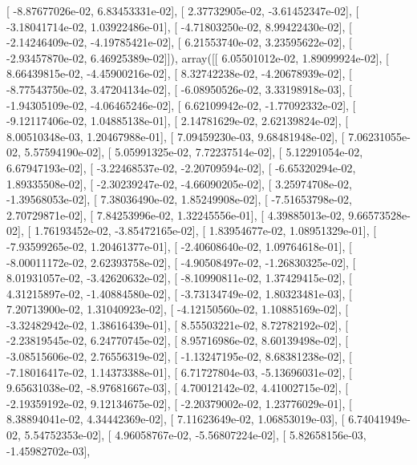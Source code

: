 \documentclass{article}
\begin{document}
       [ -8.87677026e-02,   6.83453331e-02],
       [  2.37732905e-02,  -3.61452347e-02],
       [ -3.18041714e-02,   1.03922486e-01],
       [ -4.71803250e-02,   8.99422430e-02],
       [ -2.14246409e-02,  -4.19785421e-02],
       [  6.21553740e-02,   3.23595622e-02],
       [ -2.93457870e-02,   6.46925389e-02]]), array([[  6.05501012e-02,   1.89099924e-02],
       [  8.66439815e-02,  -4.45900216e-02],
       [  8.32742238e-02,  -4.20678939e-02],
       [ -8.77543750e-02,   3.47204134e-02],
       [ -6.08950526e-02,   3.33198918e-03],
       [ -1.94305109e-02,  -4.06465246e-02],
       [  6.62109942e-02,  -1.77092332e-02],
       [ -9.12117406e-02,   1.04885138e-01],
       [  2.14781629e-02,   2.62139824e-02],
       [  8.00510348e-03,   1.20467988e-01],
       [  7.09459230e-03,   9.68481948e-02],
       [  7.06231055e-02,   5.57594190e-02],
       [  5.05991325e-02,   7.72237514e-02],
       [  5.12291054e-02,   6.67947193e-02],
       [ -3.22468537e-02,  -2.20709594e-02],
       [ -6.65320294e-02,   1.89335508e-02],
       [ -2.30239247e-02,  -4.66090205e-02],
       [  3.25974708e-02,  -1.39568053e-02],
       [  7.38036490e-02,   1.85249908e-02],
       [ -7.51653798e-02,   2.70729871e-02],
       [  7.84253996e-02,   1.32245556e-01],
       [  4.39885013e-02,   9.66573528e-02],
       [  1.76193452e-02,  -3.85472165e-02],
       [  1.83954677e-02,   1.08951329e-01],
       [ -7.93599265e-02,   1.20461377e-01],
       [ -2.40608640e-02,   1.09764618e-01],
       [ -8.00011172e-02,   2.62393758e-02],
       [ -4.90508497e-02,  -1.26830325e-02],
       [  8.01931057e-02,  -3.42620632e-02],
       [ -8.10990811e-02,   1.37429415e-02],
       [  4.31215897e-02,  -1.40884580e-02],
       [ -3.73134749e-02,   1.80323481e-03],
       [  7.20713900e-02,   1.31040923e-02],
       [ -4.12150560e-02,   1.10885169e-02],
       [ -3.32482942e-02,   1.38616439e-01],
       [  8.55503221e-02,   8.72782192e-02],
       [ -2.23819545e-02,   6.24770745e-02],
       [  8.95716986e-02,   8.60139498e-02],
       [ -3.08515606e-02,   2.76556319e-02],
       [ -1.13247195e-02,   8.68381238e-02],
       [ -7.18016417e-02,   1.14373388e-01],
       [  6.71727804e-03,  -5.13696031e-02],
       [  9.65631038e-02,  -8.97681667e-03],
       [  4.70012142e-02,   4.41002715e-02],
       [ -2.19359192e-02,   9.12134675e-02],
       [ -2.20379002e-02,   1.23776029e-01],
       [  8.38894041e-02,   4.34442369e-02],
       [  7.11623649e-02,   1.06853019e-03],
       [  6.74041949e-02,   5.54752353e-02],
       [  4.96058767e-02,  -5.56807224e-02],
       [  5.82658156e-03,  -1.45982702e-03],
\end{document}
